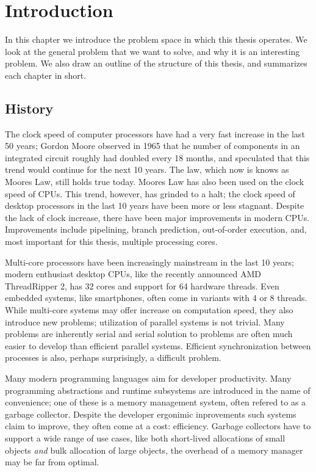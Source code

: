 \chapter{Introduction}

In this chapter we introduce the problem space in which this thesis operates.
We look at the general problem that we want to solve, and why it is an interesting problem.
We also draw an outline of the structure of this thesis, and summarizes each chapter in short.

\clearpage



\section{History}


The clock speed of computer processors have had a very fast increase in the last 50 years;
Gordon Moore observed in 1965 that he number of components in an integrated circuit roughly had
doubled every 18 months, and speculated that this trend would continue for the next 10 years.
The law, which now is knows as Moores Law, still holds true today.
Moores Law has also been used on the clock speed of CPUs. This trend, however, has grinded to a
halt; the clock speed of desktop processors in the last 10 years have been more or less stagnant.
Despite the lack of clock increase, there have been major improvements in modern CPUs. Improvements
include pipelining, branch prediction, out-of-order execution, and, most important for this thesis,
multiple processing cores.


Multi-core processors have been increasingly mainstream in the last 10 years; modern enthusiast
desktop CPUs, like the recently announced AMD ThreadRipper 2, has 32 cores and support for 64
hardware threads. Even embedded systems, like smartphones, often come in variants with 4 or 8
threads. While multi-core systems may offer increase on computation speed, they also introduce new
problems; utilization of parallel systems is not trivial. Many problems are inherently serial and
serial solution to problems are often much easier to develop than efficient parallel systems.
Efficient synchronization between processes is also, perhaps surprisingly, a difficult problem.


Many modern programming languages aim for developer productivity. Many programming abstractions and
runtime subsystems are introduced in the name of convenience; one of these is a memory management
system, often refered to as a garbage collector. Despite the developer ergonimic inprovements such
systems claim to improve, they often come at a cost: efficiency. Garbage collectors have to support
a wide range of use cases, like both short-lived allocations of small objects \emph{and} bulk
allocation of large objects, the overhead of a memory manager may be far from optimal.




